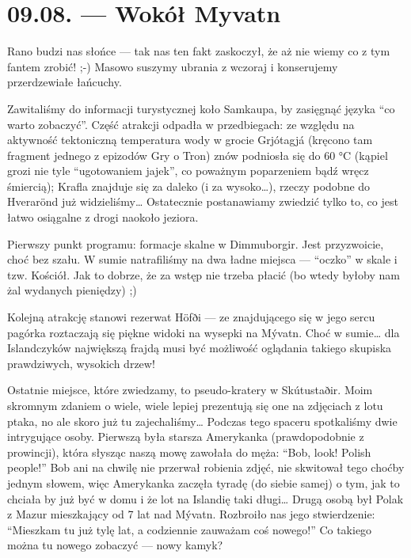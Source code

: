 \chapter*{09.08. --- Wokół Myvatn}

Rano budzi nas słońce --- tak nas ten fakt zaskoczył, że aż nie wiemy co z tym fantem zrobić! ;-) Masowo suszymy ubrania z wczoraj i konserujemy przerdzewiałe łańcuchy.

Zawitaliśmy do informacji turystycznej koło Samkaupa, by zasięgnąć języka “co warto zobaczyć”. Część atrakcji odpadła w przedbiegach: ze względu na aktywność tektoniczną temperatura wody w grocie Grjótagjá (kręcono tam fragment jednego z epizodów Gry o Tron) znów podniosła się do 60 °C (kąpiel grozi nie tyle “ugotowaniem jajek”, co poważnym poparzeniem bądź wręcz śmiercią); Krafla znajduje się za daleko (i za wysoko…), rzeczy podobne do Hverarönd już widzieliśmy… Ostatecznie postanawiamy zwiedzić tylko to, co jest łatwo osiągalne z drogi naokoło jeziora.

Pierwszy punkt programu: formacje skalne w Dimmuborgir. Jest przyzwoicie, choć bez szału. W sumie natrafiliśmy na dwa ładne miejsca --- “oczko” w skale i tzw. Kościół. Jak to dobrze, że za wstęp nie trzeba płacić (bo wtedy byłoby nam żal wydanych pieniędzy) ;)


Kolejną atrakcję stanowi rezerwat Höfði --- ze znajdującego się w jego sercu pagórka roztaczają się piękne widoki na wysepki na Mývatn. Choć w sumie… dla Islandczyków największą frajdą musi być możliwość oglądania takiego skupiska prawdziwych, wysokich drzew!

Ostatnie miejsce, które zwiedzamy, to pseudo-kratery w Skútustaðir. Moim skromnym zdaniem o wiele, wiele lepiej prezentują się one na zdjęciach z lotu ptaka, no ale skoro już tu zajechaliśmy… Podczas tego spaceru spotkaliśmy dwie intrygujące osoby. Pierwszą była starsza Amerykanka (prawdopodobnie z prowincji), która słysząc naszą mowę zawołała do męża: “Bob, look! Polish people!” Bob ani na chwilę nie przerwał robienia zdjęć, nie skwitował tego choćby jednym słowem, więc Amerykanka zaczęła tyradę (do siebie samej) o tym, jak to chciała by już być w domu i że lot na Islandię taki długi… Drugą osobą był Polak z Mazur mieszkający od 7 lat nad Mývatn. Rozbroiło nas jego stwierdzenie: “Mieszkam tu już tylę lat, a codziennie zauważam coś nowego!” Co takiego można tu nowego zobaczyć --- nowy kamyk?

